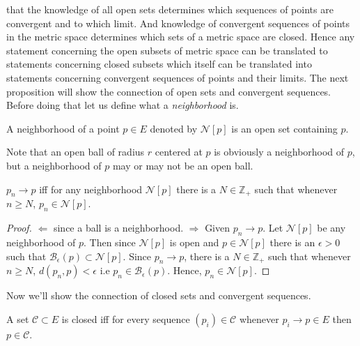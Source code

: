 that the knowledge of all open sets determines which sequences of points are convergent and to which
limit. And knowledge of convergent sequences of points in the metric space determines which sets of
a metric space are closed. Hence any statement concerning the open subsets of metric space can be
translated to statements concerning closed subsets which itself can be translated into statements
concerning convergent sequences of points and their limits. The next proposition will show the
connection of open sets and convergent sequences. Before doing that let us define what a
\emph{neighborhood} is. 
\begin{Definition}
    A neighborhood of a point $p \in E$ denoted by $\mathcal{N}[p]$ is an open set containing $p$. 
\end{Definition}
Note that an open ball of radius $r$ centered at $p$ is obviously a neighborhood of $p$, but a
neighborhood of $p$ may or may not be an open ball.
\begin{Proposition}[name=Open sets and convergent sequences]
   $p_n \rightarrow p$ iff for any neighborhood $\mathcal{N}[p]$ 
   there is a $N \in \mathbb{Z}_+$ such that whenever $n \geq N$, $p_n \in \mathcal{N}[p]$.
\end{Proposition}
\begin{proof}
    $\Leftarrow$ since a ball is a neighborhood. 
    $\Rightarrow$ Given $p_n \rightarrow p$. Let $\mathcal{N}[p]$ be any neighborhood of $p$. Then
since $\mathcal{N}[p]$ is open and $p \in \mathcal{N}[p]$ there is an $\epsilon > 0$ such that
$\mathcal{B}_{\epsilon}(p) \subset \mathcal{N}[p]$. Since $p_n \rightarrow p$, there is a $N \in
\mathbb{Z}_+$ such that whenever $n \geq N$, $d(p_n,p) < \epsilon$ i.e $p_n \in
\mathcal{B}_{\epsilon}(p)$. Hence, $p_n \in \mathcal{N}[p]$.
\end{proof}
Now we'll show the connection of closed sets and convergent sequences. 
\begin{Theorem}[name=Closed sets and convergent sequences]
    A set $\mathcal{C} \subset E$ is closed iff for every sequence $\left(p_i\right) \in
    \mathcal{C}$ whenever $p_i \rightarrow p \in E$ then $p \in \mathcal{C}$.
\end{Theorem}
